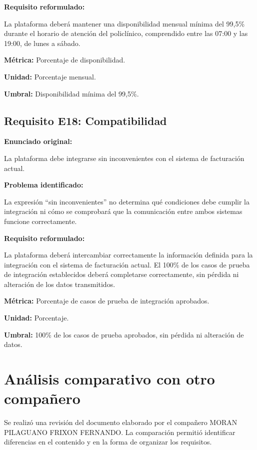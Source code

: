 \documentclass[12pt,a4paper]{article}
\begin{document}
\textbf{Requisito reformulado:}

La plataforma deberá mantener una disponibilidad mensual
mínima del 99,5\% durante el horario de atención del
policlínico, comprendido entre las 07:00 y las 19:00,
de lunes a sábado.

\textbf{Métrica:} Porcentaje de disponibilidad.

\textbf{Unidad:} Porcentaje mensual.

\textbf{Umbral:} Disponibilidad mínima del 99,5\%.

\subsection{Requisito E18: Compatibilidad}

\textbf{Enunciado original:}

La plataforma debe integrarse sin inconvenientes con el
sistema de facturación actual.

\textbf{Problema identificado:}

La expresión ``sin inconvenientes'' no determina qué
condiciones debe cumplir la integración ni cómo se
comprobará que la comunicación entre ambos sistemas
funcione correctamente.

\textbf{Requisito reformulado:}

La plataforma deberá intercambiar correctamente la
información definida para la integración con el sistema
de facturación actual. El 100\% de los casos de prueba
de integración establecidos deberá completarse
correctamente, sin pérdida ni alteración de los datos
transmitidos.

\textbf{Métrica:} Porcentaje de casos de prueba de integración
aprobados.

\textbf{Unidad:} Porcentaje.

\textbf{Umbral:} 100\% de los casos de prueba aprobados,
sin pérdida ni alteración de datos.

\section{Análisis comparativo con otro compañero}

Se realizó una revisión del documento elaborado por el compañero MORAN PILAGUANO FRIXON FERNANDO. La comparación permitió identificar
diferencias en el contenido y en la forma de organizar
los requisitos.
\end{document}
